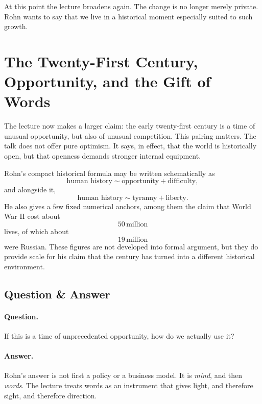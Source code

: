 At this point the lecture broadens again. The change is no longer merely private. Rohn wants to say that we live in a historical moment especially suited to such growth.

\section{The Twenty-First Century, Opportunity, and the Gift of Words}

The lecture now makes a larger claim: the early twenty-first century is a time of unusual opportunity, but also of unusual competition. This pairing matters. The talk does not offer pure optimism. It says, in effect, that the world is historically open, but that openness demands stronger internal equipment.

Rohn's compact historical formula may be written schematically as
\begin{equation}
\text{human history} \sim \text{opportunity} + \text{difficulty},
\end{equation}
and alongside it,
\begin{equation}
\text{human history} \sim \text{tyranny} + \text{liberty}.
\end{equation}
He also gives a few fixed numerical anchors, among them the claim that World War II cost about
\begin{equation}
50\,\text{million}
\end{equation}
lives, of which about
\begin{equation}
19\,\text{million}
\end{equation}
were Russian. These figures are not developed into formal argument, but they do provide scale for his claim that the century has turned into a different historical environment.

\subsection{Question \& Answer}

\paragraph{Question.} If this is a time of unprecedented opportunity, how do we actually use it?

\paragraph{Answer.} Rohn's answer is not first a policy or a business model. It is \emph{mind}, and then \emph{words}. The lecture treats words as an instrument that gives light, and therefore sight, and therefore direction.


